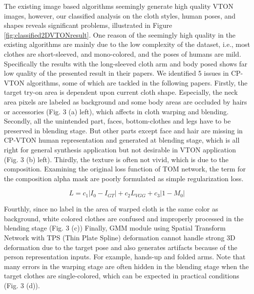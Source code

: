 The existing image based algorithms seemingly generate high quality VTON images, however, our classified analysis on the cloth styles, human poses, and shapes reveals significant problems, illustrated in Figure \ref{fig:classified2DVTONresult}. One reason of the seemingly high quality in the existing algorithms are mainly due to the low complexity of the dataset, i.e., most clothes are short-sleeved, and mono-colored, and the poses of humans are mild. Specifically the results with the long-sleeved cloth arm and body posed shows far low quality of the presented result in their papers. We identified 5 issues in CP-VTON\cite{Wang2018TowardCI} algorithms, some of which are tackled in the following papers. Firstly, the target try-on area is dependent upon current cloth shape. Especially, the neck area pixels are labeled as background and some body areas are occluded by hairs or accessories (Fig. 3 (a) left), which affects in cloth warping and blending. Secondly, all the unintended part, faces, bottom-clothes and legs have to be preserved in blending stage. But other parts except face and hair are missing in CP-VTON\cite{Wang2018TowardCI} human representation and generated at blending stage, which is all right for general synthesis application but not desirable in VTON application (Fig. 3 (b) left). Thirdly, the texture is often not vivid, which is due to the composition. Examining the original loss function of TOM network, the term for the composition alpha mask are poorly formulated as simple regularization loss.   

\begin{equation}
L = c_1 | I_0-I_{GT} |+  c_2 L_{VGG}+c_3 |1-M_0 |        
\end{equation} 

Fourthly, since no label in the area of warped cloth is the same color as background, white colored clothes are confused and improperly processed in the blending stage (Fig. 3 (c))
Finally, GMM module using Spatial Transform Network\cite{JaderbergSZK15} with TPS (Thin Plate Spline)\cite{Bookstein1989PrincipalWT} deformation cannot handle strong 3D deformation due to the target pose and also generates artifacts because of the person representation inputs. For example, hands-up and folded arms.  Note that many errors in the warping stage are often hidden in the blending stage when the target clothes are single-colored, which can be expected in practical conditions (Fig. 3 (d)).

